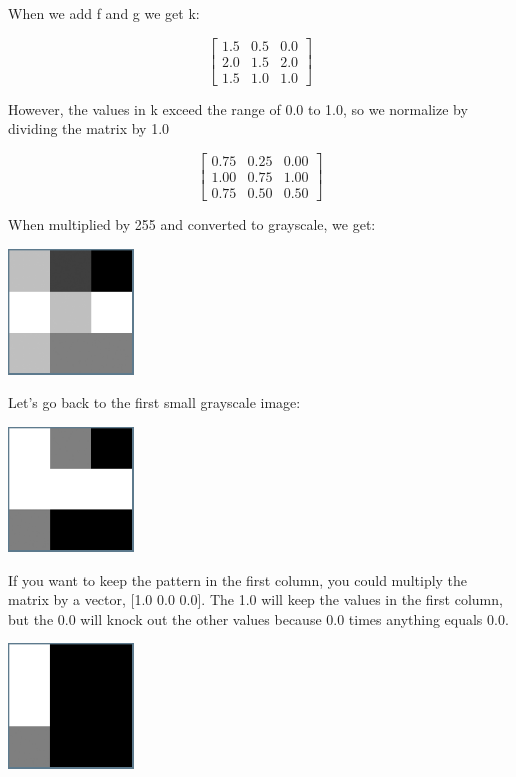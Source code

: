 When we add f and g we get k:

$$\begin{bmatrix}
1.5 & 0.5 & 0.0\\
2.0 & 1.5 & 2.0\\
1.5 & 1.0 & 1.0 
\end{bmatrix}$$

However, the values in k exceed the range of 0.0 to 1.0, so we normalize by 
dividing the matrix by 1.0

$$\begin{bmatrix}
0.75 & 0.25 & 0.00\\
1.00 & 0.75 & 1.00\\
0.75 & 0.50 & 0.50  
\end{bmatrix}$$

When multiplied by 255 and converted to grayscale, we get:

\includegraphics[width=0.25\textwidth]{fgBitmapAdded.png}

Let's go back to the first small grayscale image:

\includegraphics[width=0.25\textwidth]{fBitmap.png}

If you want to keep the pattern in the first column, you could multiply the 
matrix by a vector, [1.0 0.0 0.0]. The 1.0 will keep the values in the first 
column, but the 0.0 will knock out the other values because 0.0 times anything 
equals 0.0.

\includegraphics[width=0.25\textwidth]{onechannel.png}

